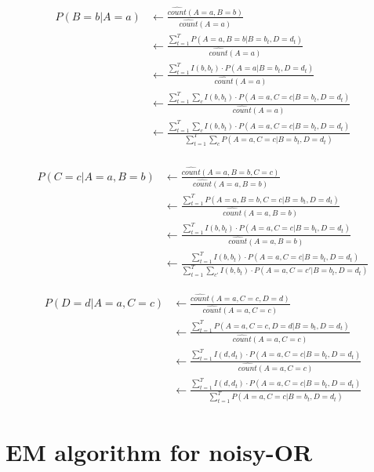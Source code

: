 \documentclass[11]{article}
\begin{document}
\begin{enumerate}[label=(\alph*)]
\begin{align*}
P(B=b|A=a) &\longleftarrow \frac{\widehat{count}(A=a,B=b)}{\widehat{count}(A=a)}\\
&\longleftarrow \frac{\sum_{t=1}^T P(A=a, B=b|B=b_t,D=d_t)}{\widehat{count}(A=a)}\\
&\longleftarrow \frac{\sum_{t=1}^T I(b,b_t) \cdot P(A=a|B=b_t,D=d_t)}{\widehat{count}(A=a)}\\
&\longleftarrow \frac{\sum_{t=1}^T \sum_c I(b,b_t) \cdot P(A=a,C=c|B=b_t,D=d_t)}{\widehat{count}(A=a)}\\
&\longleftarrow \frac{\sum_{t=1}^T \sum_c I(b,b_t) \cdot P(A=a,C=c|B=b_t,D=d_t)}{\sum_{t=1}^T \sum_c P(A=a,C=c|B=b_t,D=d_t)}\\
\end{align*}

\begin{align*}
P(C=c|A=a,B=b) &\longleftarrow \frac{\widehat{count}(A=a,B=b,C=c)}{\widehat{count}(A=a,B=b)}\\
&\longleftarrow \frac{\sum_{t=1}^T P(A=a,B=b,C=c|B=b_t,D=d_t)}{\widehat{count}(A=a,B=b)}\\
&\longleftarrow \frac{\sum_{t=1}^T I(b,b_t) \cdot P(A=a,C=c|B=b_t,D=d_t)}{\widehat{count}(A=a,B=b)}\\
&\longleftarrow \frac{\sum_{t=1}^T I(b,b_t) \cdot P(A=a,C=c|B=b_t,D=d_t)}{\sum_{t=1}^T \sum_{c'} I(b,b_t) \cdot P(A=a,C=c'|B=b_t,D=d_t)}
\end{align*}

\begin{align*}
P(D=d|A=a,C=c) &\longleftarrow \frac{\widehat{count}(A=a,C=c,D=d)}{\widehat{count}(A=a,C=c)}\\
&\longleftarrow \frac{\sum_{t=1}^T P(A=a,C=c,D=d|B=b_t,D=d_t)}{\widehat{count}(A=a,C=c)}\\
&\longleftarrow \frac{\sum_{t=1}^T I(d,d_t) \cdot P(A=a,C=c|B=b_t,D=d_t)}{\widehat{count}(A=a,C=c)}\\
&\longleftarrow \frac{\sum_{t=1}^T I(d,d_t) \cdot P(A=a,C=c|B=b_t,D=d_t)}{\sum_{t=1}^T P(A=a,C=c|B=b_t,D=d_t)}
\end{align*}

\end{enumerate}
\section{EM algorithm for noisy-OR}
\end{document}
